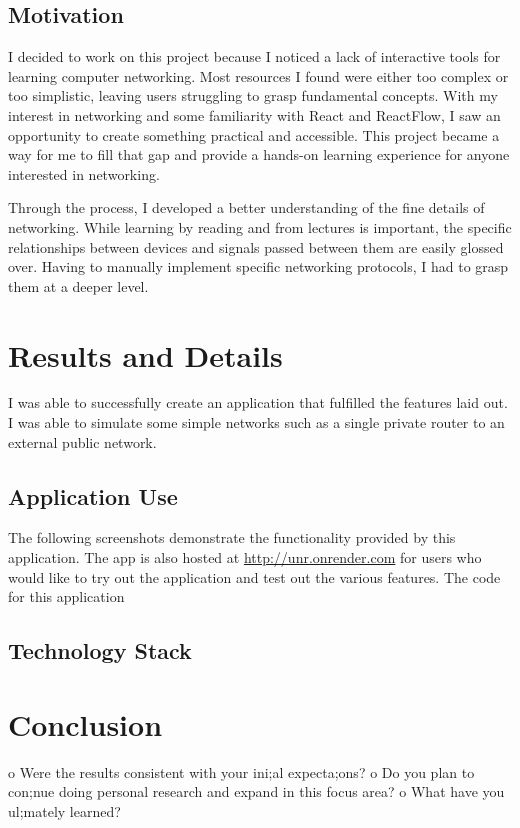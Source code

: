 \documentclass{assignment-x}
\begin{document}
\subsection{Motivation}
I decided to work on this project because I noticed a lack of interactive tools for learning computer networking. Most resources I found were either too complex or too simplistic, leaving users struggling to grasp fundamental concepts. With my interest in networking and some familiarity with React and ReactFlow, I saw an opportunity to create something practical and accessible. This project became a way for me to fill that gap and provide a hands-on learning experience for anyone interested in networking.

Through the process, I developed a better understanding of the fine details of networking. While learning by reading and from lectures is important, the specific relationships between devices and signals passed between them are easily glossed over. Having to manually implement specific networking protocols, I had to grasp them at a deeper level.

\section{Results and Details}
I was able to successfully create an application that fulfilled the features laid out.
I was able to simulate some simple networks such as a single private router to an external public network.

\subsection{Application Use}
The following screenshots demonstrate the functionality provided by this application. The app is also hosted at \url{http://unr.onrender.com} for users who would like to try out the application and test out the various features. The code for this application

\subsection{Technology Stack}


\section{Conclusion}
o Were the results consistent with your ini;al expecta;ons?
o Do you plan to con;nue doing personal research and expand in this focus area?
o What have you ul;mately learned?
\end{document}
